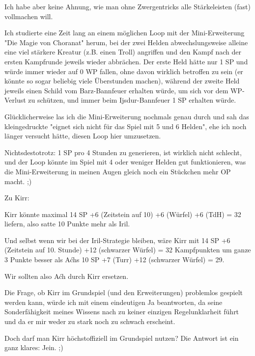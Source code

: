 \documentclass[10pt, a4paper, oneside]{book}
\begin{document}
{Ich habe aber keine Ahnung, wie man ohne Zwergentricks alle Stärkeleisten (fast) vollmachen will.

Ich studierte eine Zeit lang an einem möglichen Loop mit der Mini-Erweiterung "Die Magie von Choranat" herum, bei der zwei Helden abwechslungsweise alleine eine viel stärkere Kreatur (z.B. einen Troll) angriffen und den Kampf nach der ersten Kampfrunde jeweils wieder abbrächen. Der erste Held hätte nur 1 SP und würde immer wieder auf 0 WP fallen, ohne davon wirklich betroffen zu sein (er könnte so sogar beliebig viele Überstunden machen), während der zweite Held jeweils einen Schild vom Barz-Bannfeuer erhalten würde, um sich vor dem WP-Verlust zu schützen, und immer beim Ijsdur-Bannfeuer 1 SP erhalten würde.

Glücklicherweise las ich die Mini-Erweiterung nochmals genau durch und sah das kleingedruckte "eignet sich nicht für das Spiel mit 5 und 6 Helden", ehe ich noch länger versucht hätte, diesen Loop hier umzusetzen.

Nichtsdestotrotz: 1 SP pro 4 Stunden zu generieren, ist wirklich nicht schlecht, und der Loop könnte im Spiel mit 4 oder weniger Helden gut funktionieren, was die Mini-Erweiterung in meinen Augen gleich noch ein Stückchen mehr OP macht. ;)\bigskip







Zu Kirr:



Kirr könnte maximal 14 SP +6 (Zeitstein auf 10) +6 (Würfel) +6 (TdH) = 32 liefern, also satte 10 Punkte mehr als Iril.

Und selbst wenn wir bei der Iril-Strategie bleiben, wäre Kirr mit 14 SP +6 (Zeitstein auf 10. Stunde) +12 (schwarzer Würfel) = 32 Kampfpunkten um ganze 3 Punkte besser als Aćhs 10 SP +7 (Turr) +12 (schwarzer Würfel) = 29.

Wir sollten also Aćh durch Kirr ersetzen.



Die Frage, ob Kirr im Grundspiel (und den Erweiterungen) problemlos gespielt werden kann, würde ich mit einem eindeutigen Ja beantworten, da seine Sonderfähigkeit meines Wissens nach zu keiner einzigen Regelunklarheit führt und da er mir weder zu stark noch zu schwach erscheint.



Doch darf man Kirr höchstoffiziell im Grundspiel nutzen? Die Antwort ist ein ganz klares: Jein. ;)

}
\end{document}
